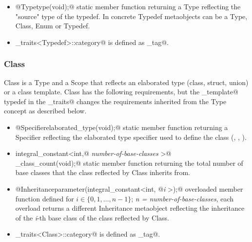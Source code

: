 \begin{itemize}
	\item{\verb@static @{\metaobject Type}\verb@ type(void);@} static member function
	returning a {\metaobject Type} reflecting the "source" type of the typedef.
	In concrete {\metaobject Typedef} metaobjects \verb@type@ can be a 
	{\metaobject Type}, {\metaobject Class}, {\metaobject Enum} or {\metaobject Typedef}.

	\item \verb@metaobject_traits<Typedef>::category@ is defined as \verb@typedef_tag@.
\end{itemize}

\subsubsection{Class}

{\metaobject Class} is a {\metaobject Type} and a {\metaobject Scope} that reflects
an elaborated type (class, struct, union) or a class template.
{\metaobject Class} has the following requirements, but
the \verb@is_template@ typedef in the \verb@metaobject_traits@ changes the requirements
inherited from the {\metaobject Type} concept as described below.

\begin{itemize}
	\item{\verb@static @{\metaobject Specifier}\verb@ elaborated_type(void);@}
	static member function returning a {\metaobject Specifier} reflecting the elaborated
	type specifier used to define the class (\verb@class@, \verb@struct@, \verb@union@).

	\item{\verb@static integral_constant<int,@ {\em number-of-base-classes}
	\verb@>@\\\verb@base_class_count(void);@} static member function returning the total number
	of base classes that the class reflected by {\metaobject Class} inherits from.

	\item{\verb@static @{\metaobject Inheritance}\verb@ parameter(integral_constant<int, @{\em i}
	\verb@>);@} overloaded member function defined
	for $i \in \{0, 1, \dots, n-1\}$; {\em n = number-of-base-classes},
	each overload returns a different {\metaobject Inheritance} metaobject reflecting the inheritance
	of the {\em i}-th base class of the class reflected by {\metaobject Class}.

	\item \verb@metaobject_traits<Class>::category@ is defined as \verb@class_tag@.
\end{itemize}

